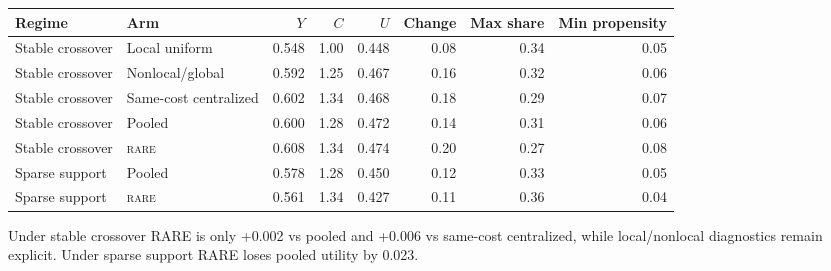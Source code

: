 \documentclass[10pt,a4paper,landscape]{article}
\newcommand{\rare}{\textsc{rare}}\newcommand{\na}{\textsc{n/a}}\newcommand{\nog}{\textsc{no-go}}\newcommand{\ok}{\textsc{pass}}
\begin{document}
\begin{center}\small\begin{tabular}{llrrrrrr}\toprule Regime & Arm & $Y$ & $C$ & $U$ & Change & Max share & Min propensity \\\midrule
Stable crossover & Local uniform & 0.548 & 1.00 & 0.448 & 0.08 & 0.34 & 0.05 \\

Stable crossover & Nonlocal/global & 0.592 & 1.25 & 0.467 & 0.16 & 0.32 & 0.06 \\

Stable crossover & Same-cost centralized & 0.602 & 1.34 & 0.468 & 0.18 & 0.29 & 0.07 \\

Stable crossover & Pooled & 0.600 & 1.28 & 0.472 & 0.14 & 0.31 & 0.06 \\

Stable crossover & \rare{} & 0.608 & 1.34 & 0.474 & 0.20 & 0.27 & 0.08 \\

Sparse support & Pooled & 0.578 & 1.28 & 0.450 & 0.12 & 0.33 & 0.05 \\

Sparse support & \rare{} & 0.561 & 1.34 & 0.427 & 0.11 & 0.36 & 0.04 \\

\bottomrule\end{tabular}\end{center}
Under stable crossover RARE is only +0.002 vs pooled and +0.006 vs same-cost centralized, while local/nonlocal diagnostics remain explicit. Under sparse support RARE loses pooled utility by 0.023.
\end{document}
